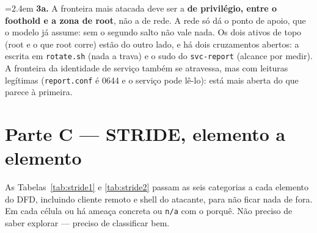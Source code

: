 \documentclass[a4paper,11pt]{article}
\newenvironment{answer}[1]{%
  \par\addvspace{7pt}\noindent
  \hangindent=2.4em\hangafter=1
  {\color{sscnblue}\bfseries #1\hspace{0.55em}}\ignorespaces}
  {\par\addvspace{5pt}}
\newcommand{\cmd}[1]{\textcolor{sscnblue}{\texttt{#1}}}
\begin{document}
\begin{answer}{3a.}
A fronteira mais atacada deve ser a \textbf{de privil\'egio, entre o foothold e a
zona de root}, n\~ao a de rede. A rede s\'o d\'a o ponto de apoio, que o modelo j\'a
assume: sem o segundo salto n\~ao vale nada. Os dois ativos de topo (root e o que
root corre) est\~ao do outro lado, e h\'a dois cruzamentos abertos: a escrita em
\cmd{rotate.sh} (nada a trava) e o sudo do \cmd{svc-report} (alcance por medir).
A fronteira da identidade de servi\c{c}o tamb\'em se atravessa, mas com leituras
leg\'itimas (\cmd{report.conf} \'e 0644 e o servi\c{c}o pode l\^e-lo): est\'a mais
aberta do que parece \`a primeira.
\end{answer}

\section{Parte C --- STRIDE, elemento a elemento}
As Tabelas~\ref{tab:stride1} e \ref{tab:stride2} passam as seis categorias a cada
elemento do DFD, incluindo cliente remoto e shell do atacante, para n\~ao ficar
nada de fora. Em cada c\'elula ou h\'a amea\c{c}a concreta ou \cmd{n/a} com o
porqu\^e. N\~ao preciso de saber explorar --- preciso de classificar bem.
\end{document}
